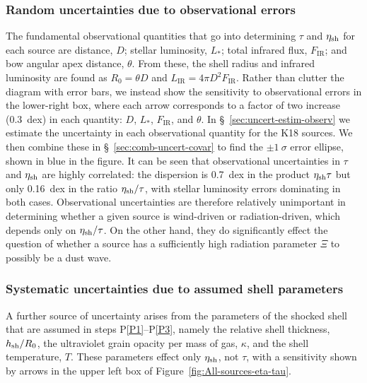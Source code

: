 \subsubsection{Random uncertainties due to observational errors}
\label{sec:rand-syst-uncert}

The fundamental observational quantities that go into determining
\(\tau\) and \(\eta_{\text{sh}}\) for each source are distance, \(D\);
stellar luminosity, \(L_*\); total infrared flux, \(F_{\text{IR}}\);
and bow angular apex distance, \(\theta\).  From these, the shell
radius and infrared luminosity are found as \(R_0 = \theta D\) and
\(L_{\text{IR}} = 4\pi D^2 F_{\text{IR}}\).  Rather than clutter the
diagram with error bars, we instead show the sensitivity to
observational errors in the lower-right box, where each arrow
corresponds to a factor of two increase (0.3~dex) in each quantity:
\(D\), \(L_*\), \(F_{\text{IR}}\), and \(\theta\).  In
\S~\ref{sec:uncert-estim-observ} we estimate the uncertainty in each
observational quantity for the K18 sources.  We then combine these in
\S~\ref{sec:comb-uncert-covar} to find the \(\pm 1~\sigma\) error
ellipse, shown in blue in the figure.  It can be seen that
observational uncertainties in \(\tau\) and \(\eta_{\text{sh}}\) are highly
correlated: the dispersion is \SI{0.7}{dex} in the product
\(\eta_{\text{sh}} \tau\) but only \SI{0.16}{dex} in the ratio
\(\eta_{\text{sh}}/\tau\), with stellar luminosity errors dominating in both
cases.  Observational uncertainties are therefore relatively
unimportant in determining whether a given source is wind-driven or
radiation-driven, which depends only on \(\eta_{\text{sh}}/\tau\).  On the
other hand, they do significantly effect the question of whether a
source has a sufficiently high radiation parameter \(\Xi\) to possibly
be a dust wave.

\subsubsection{Systematic uncertainties due to assumed shell parameters}
\label{sec:syst-uncert-due}

A further source of uncertainty arises from the parameters of the
shocked shell that are assumed in steps P\ref{P1}--P\ref{P3}, namely
the relative shell thickness, \(h_{\text{sh}}/R_0\), the ultraviolet grain
opacity per mass of gas, \(\kappa\), and the shell temperature, \(T\).
These parameters effect only \(\eta_{\text{sh}}\), not \(\tau\), with a
sensitivity shown by arrows in the upper left box of
Figure~\ref{fig:All-sources-eta-tau}.

